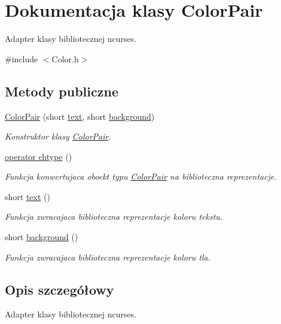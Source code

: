 \hypertarget{class_color_pair}{}\section{Dokumentacja klasy Color\+Pair}
\label{class_color_pair}


Adapter klasy bibliotecznej ncurses.  




{\ttfamily \#include $<$Color.\+h$>$}

\subsection*{Metody publiczne}
\begin{DoxyCompactItemize}
\item 
\hyperlink{class_color_pair_a7df2f6130db43995c6be152393ab5154}{Color\+Pair} (short \hyperlink{class_color_pair_aea1cad9443dc9af5c21cc2eff02d25fa}{text}, short \hyperlink{class_color_pair_ada47f2ba6bd0ebaabe969f279a9e24a7}{background})
\begin{DoxyCompactList}\small\item\em Konstruktor klasy \hyperlink{class_color_pair}{Color\+Pair}. \end{DoxyCompactList}\item 
\hyperlink{class_color_pair_ad03b4dde3935995da2b8f79867230502}{operator chtype} ()
\begin{DoxyCompactList}\small\item\em Funkcja konwertujaca oboekt typu \hyperlink{class_color_pair}{Color\+Pair} na biblioteczna reprezentacje. \end{DoxyCompactList}\item 
short \hyperlink{class_color_pair_aea1cad9443dc9af5c21cc2eff02d25fa}{text} ()
\begin{DoxyCompactList}\small\item\em Funkcja zwracajaca biblioteczna reprezentacje koloru tekstu. \end{DoxyCompactList}\item 
short \hyperlink{class_color_pair_ada47f2ba6bd0ebaabe969f279a9e24a7}{background} ()
\begin{DoxyCompactList}\small\item\em Funkcja zwracajaca biblioteczna reprezentacje koloru tla. \end{DoxyCompactList}\end{DoxyCompactItemize}


\subsection{Opis szczegółowy}
Adapter klasy bibliotecznej ncurses. 

